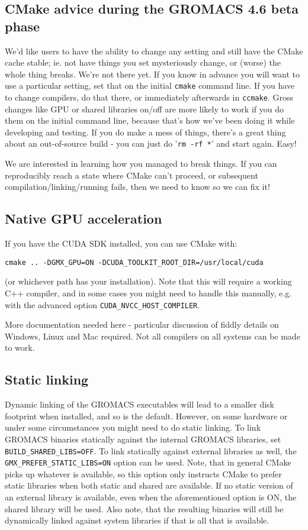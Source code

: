 \documentclass{article}[12pt,a4paper,twoside]
\newcommand{\gromacs}{GROMACS}
\newcommand{\cuda}{CUDA}
\newcommand{\cmake}{CMake}
\begin{document}
\subsection{CMake advice during the GROMACS 4.6 beta phase}
We'd like users to have the ability to change any setting and still
have the \cmake{} cache stable; ie. not have things you set
mysteriously change, or (worse) the whole thing breaks. We're not
there yet. If you know in advance you will want to use a particular
setting, set that on the initial \texttt{cmake} command line. If you
have to change compilers, do that there, or immediately afterwards in
\texttt{ccmake}. Gross changes like GPU or shared libraries on/off are
more likely to work if you do them on the initial command line,
because that's how we've been doing it while developing and
testing. If you do make a mess of things, there's a great thing about
an out-of-source build - you can just do '\verb+rm -rf *+' and start
again. Easy!

We are interested in learning how you managed to break things. If you
can reproducibly reach a state where \cmake{} can't proceed, or
subsequent compilation/linking/running fails, then we need to know so
we can fix it!

\subsection{Native GPU acceleration}
If you have the \cuda{} SDK installed, you can use \cmake{}
with:
\begin{verbatim}
cmake .. -DGMX_GPU=ON -DCUDA_TOOLKIT_ROOT_DIR=/usr/local/cuda
\end{verbatim}
(or whichever path has your installation). Note that this will require
a working C++ compiler, and in some cases you might need to handle
this manually, e.g. with the advanced option
\texttt{CUDA\_NVCC\_HOST\_COMPILER}.

More documentation needed here - particular discussion of fiddly
details on Windows, Linux and Mac required. Not all compilers on all
systems can be made to work.

\subsection{Static linking}
Dynamic linking of the \gromacs{} executables will lead to a smaller
disk footprint when installed, and so is the default. However, on some
hardware or under some circumstances you might need to do static
linking. To link \gromacs{} binaries statically against the internal
\gromacs{} libraries, set \texttt{BUILD\_SHARED\_LIBS=OFF}. To link
statically against external libraries as well, the
\texttt{GMX\_PREFER\_STATIC\_LIBS=ON} option can be used. Note, that
in general \cmake{} picks up whatever is available, so this option
only instructs \cmake{} to prefer static libraries when both static
and shared are available. If no static version of an external library
is available, even when the aforementioned option is ON, the shared
library will be used. Also note, that the resulting binaries will
still be dynamically linked against system libraries if that is all
that is available.
\end{document}
